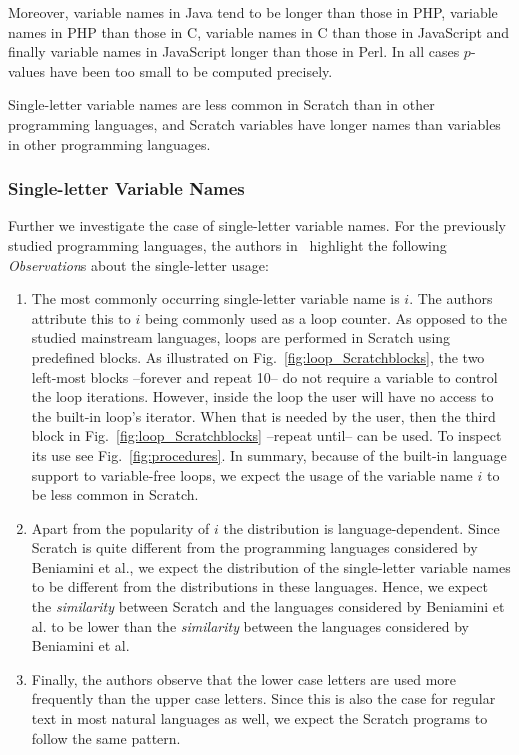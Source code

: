 \documentclass[conference]{IEEEtran}
\begin{document}
Moreover, variable names in Java tend to be longer than those in PHP, variable names in  PHP than those in C, variable names in C than those in JavaScript and finally variable names in JavaScript longer than those in Perl. In all cases $p$-values have been too small to be computed precisely.

\begin{framed}
Single-letter variable names are less common in Scratch than in other programming languages, and Scratch variables have longer names than variables in other programming languages.
\end{framed}

\subsubsection{Single-letter Variable Names}
\label{res:var:names}
Further we investigate the case of single-letter variable names. For the previously studied programming languages, the authors in~\cite{Beniamini} highlight the following \emph{Observation}s about the single-letter usage: 

\begin{enumerate}[label=\emph{\alph*})]
\item The most commonly occurring single-letter variable name is $i$.
The authors attribute this to $i$ being commonly used as a loop counter. 
As opposed to the studied mainstream languages, loops are performed in Scratch using predefined blocks. 
As illustrated on Fig.~\ref{fig:loop_Scratchblocks}, the  two left-most blocks --forever and repeat 10-- do not require a variable to control the loop iterations. However, inside the loop the user will have no access to the built-in loop's iterator. When that is needed by the user, then the third block in Fig.~\ref{fig:loop_Scratchblocks} --repeat until-- can be used. To inspect its use see Fig.~\ref{fig:procedures}. In summary,  because of the built-in language support to variable-free loops, we expect the usage of the variable name $i$ to be less common in Scratch. \label{single-letter-vars:i}

\item Apart from the popularity of $i$ the distribution is language-dependent. 
Since Scratch is quite different from the programming languages considered by Beniamini et al., we expect the distribution of the single-letter variable names to be different from the distributions in these languages. 
Hence, we expect the \emph{similarity} between Scratch and the languages considered by Beniamini et al. to be lower than the \emph{similarity} between the languages considered by Beniamini et al. \label{single-letter-vars:similarity}

\item Finally, the authors observe that the lower case letters are used more frequently than the upper case letters. Since this is also the case for regular text in most natural languages as well, we expect the Scratch programs to follow the same pattern. \label{single-letter-vars:upercase:lowercase}
\end{enumerate}
\end{document}
